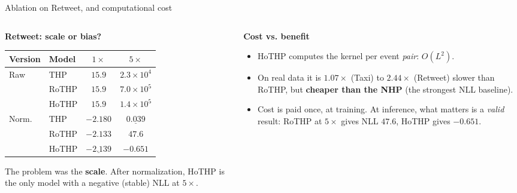 \documentclass[aspectratio=169]{beamer}
\begin{document}
\begin{frame}{Ablation on Retweet, and computational cost}
  \begin{columns}[T]
    \begin{column}{0.5\textwidth}
      \textbf{Retweet: scale or bias?}
      {\scriptsize
      \begin{tabular}{llcc}
        \toprule
        Version & Model & $1\times$ & $5\times$ \\
        \midrule
        \multirow{3}{*}{Raw}
          & THP   & $15.9$ & $2.3{\times}10^{4}$ \\
          & RoTHP & $15.9$ & $7.0{\times}10^{5}$ \\
          & HoTHP & $15.9$ & $1.4{\times}10^{5}$ \\
        \midrule
        \multirow{3}{*}{Norm.}
          & THP   & $\mathbf{-2.180}$ & $\underline{0.039}$ \\
          & RoTHP & $-2.133$ & $47.6$ \\
          & HoTHP & $\underline{-2.139}$ & $\mathbf{-0.651}$ \\
        \bottomrule
      \end{tabular}}
      \vspace{0.4em}

      {\small The problem was the \textbf{scale}. After normalization, HoTHP is the
      only model with a negative (stable) NLL at $5\times$.}
    \end{column}
    \begin{column}{0.5\textwidth}
      \textbf{Cost vs. benefit}
      \begin{itemize}
        \small
        \item HoTHP computes the kernel per event \emph{pair}: $O(L^2)$.
        \item On real data it is $1.07\times$ (Taxi) to $2.44\times$ (Retweet)
              slower than RoTHP, but \textbf{cheaper than the NHP} (the strongest
              NLL baseline).
        \item Cost is paid once, at training. At inference, what matters is a
              \emph{valid} result: RoTHP at $5\times$ gives NLL $47.6$, HoTHP gives
              $-0.651$.
      \end{itemize}
    \end{column}
  \end{columns}
\end{frame}

\end{document}
